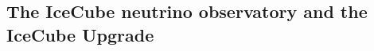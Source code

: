 \documentclass[a4paper,11pt]{article}
\begin{document}




\subsection{The IceCube neutrino observatory and the IceCube Upgrade}

\end{document}
